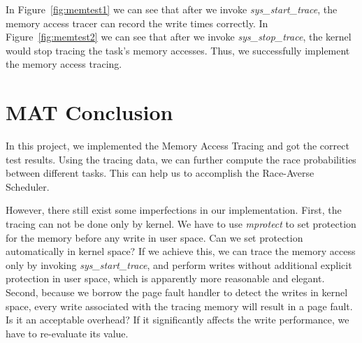 In Figure~\ref{fig:memtest1} we can see that after we invoke \textit{sys\_start\_trace}, the memory access tracer can record the write times correctly. In Figure~\ref{fig:memtest2} we can see that after we invoke \textit{sys\_stop\_trace}, the kernel would stop tracing the task's memory accesses. Thus, we successfully implement the memory access tracing.

\section{MAT Conclusion}

In this project, we implemented the Memory Access Tracing and got the correct test results. Using the tracing data, we can further compute the race probabilities between different tasks. This can help us to accomplish the Race-Averse Scheduler.

However, there still exist some imperfections in our implementation. First, the tracing can not be done only by kernel. We have to use \textit{mprotect} to set protection for the memory before any write in user space. Can we set protection automatically in kernel space? If we achieve this, we can trace the memory access only by invoking \textit{sys\_start\_trace}, and perform writes without additional explicit protection in user space, which is apparently more reasonable and elegant. Second, because we borrow the page fault handler to detect the writes in kernel space, every write associated with the tracing memory will result in a page fault. Is it an acceptable overhead? If it significantly affects the write performance, we have to re-evaluate its value.
